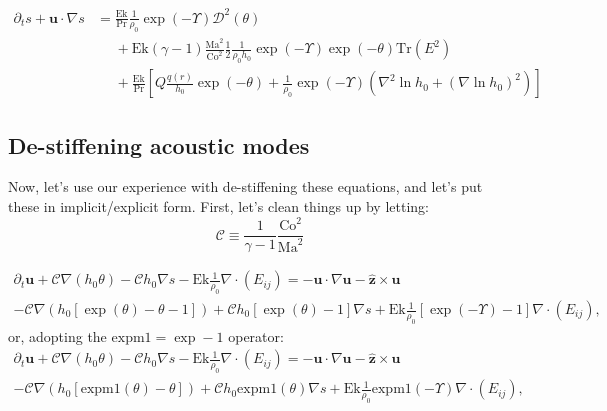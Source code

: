 \documentclass{aastex631}
\newcommand{\del}{\nabla}
\renewcommand{\vec}{\boldsymbol}
\newcommand{\scrC}{\mathcal{C}}
\newcommand{\scrD}{\mathcal{D}}
\newcommand{\expm}{\mathrm{expm1}}
\begin{document}
\begin{align}
  \partial_t s + \vec{u}\cdot \del s &=
  \frac{\mathrm{Ek}}{\mathrm{Pr}} \frac{1}{\rho_0} \exp(-\Upsilon)\scrD^2(\theta) \nonumber\\
  &\phantom{=}+ \mathrm{Ek} (\gamma-1)\frac{\mathrm{Ma}^{2}}{\mathrm{Co}^2} \frac{1}{2}\frac{1}{\rho_0 h_0}\exp(-\Upsilon) \exp(-\theta)\mathrm{Tr}(E^2)\nonumber\\
  &\phantom{=}+ \frac{\mathrm{Ek}}{\mathrm{Pr}}\left[Q \frac{q(r)}{h_0}\exp(-\theta) +  \frac{1}{\rho_0} \exp(-\Upsilon) \left(\nabla^2 \ln h_0 + (\nabla \ln h_0)^2 \right)\right]
\end{align}

\subsection{De-stiffening acoustic modes}
Now, let's use our experience with de-stiffening these equations, and let's put these in implicit/explicit form.  First, let's clean things up by letting:
\begin{equation}
  \scrC \equiv \frac{1}{\gamma-1}\frac{\mathrm{Co}^2}{\mathrm{Ma}^{2}}
\end{equation}

\begin{multline}
  \partial_t \vec{u}
  + \scrC \del (h_0 \theta)
  - \scrC h_0 \del s
  - \mathrm{Ek}\frac{1}{\rho_0}\del\cdot (E_{ij})
  =
  - \vec{u}\cdot \del \vec{u} - \vec{\hat{z}} \times \vec{u} \\
  - \scrC \del (h_0[\exp(\theta)-\theta - 1])
  + \scrC h_0\left[\exp(\theta)-1\right]\del s
  + \mathrm{Ek}\frac{1}{\rho_0}\left[\exp(-\Upsilon)-1\right]\del\cdot (E_{ij}),
\end{multline}
or, adopting the $\expm = \exp - 1$ operator:
\begin{multline}
  \partial_t \vec{u}
  + \scrC \del (h_0 \theta)
  - \scrC h_0 \del s
  - \mathrm{Ek}\frac{1}{\rho_0}\del\cdot (E_{ij})
  =
  - \vec{u}\cdot \del \vec{u} - \vec{\hat{z}} \times \vec{u} \\
  - \scrC \del (h_0[\expm(\theta)-\theta])
  + \scrC h_0 \expm(\theta)\del s
  + \mathrm{Ek}\frac{1}{\rho_0}\expm(-\Upsilon) \del\cdot (E_{ij}),
\end{multline}
\end{document}
